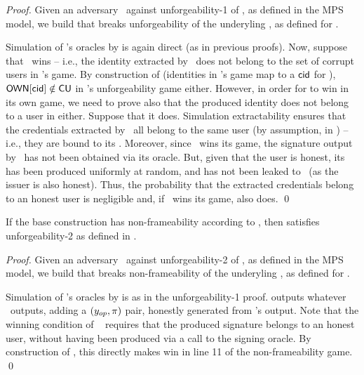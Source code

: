 \begin{proof}
  Given an adversary \adv~against unforgeability-1 of \CUASMPS, as defined in
  the MPS model, we build \advB that breaks unforgeability of the underyling
  \CUASGen, as defined for \UAS.

  Simulation of \adv's oracles by \advB is again direct (as in previous proofs).
  Now, suppose that \adv~wins -- i.e., the identity extracted by \adv~does not
  belong to the set of corrupt users in \adv's game. By construction of \advB
  (identities in \adv's game map to a $\mathsf{cid}$ for \advB), $\mathsf{OWN}[\mathsf{cid}] \notin
  \mathsf{CU}$ in \advB's unforgeability game either.
  However, in order for \advB to win in its own game, we need to prove also that
  the produced identity does not belong to a user in \HU either. Suppose that it
  does. Simulation extractability ensures that the credentials extracted by
  \adv~all belong to the same user (by assumption, in \HU) -- i.e., they are
  bound to its \usk. Moreover, since \adv~wins its game, the signature output by
  \adv~has not been obtained via its \SIGN oracle. But, given that the user is
  honest, its \usk has been produced uniformly at random, and has not been
  leaked to \adv~(as the issuer is also honest). Thus, the probability that
  the extracted credentials belong to an honest user is negligible and, if
  \adv~wins its game, \advB also does.
  \qed
\end{proof}

\begin{theorem}
  If the base \CUASGen construction has non-frameability according to
  , then \CUASMPS satisfies unforgeability-2 as
  defined in \cite{ngsy22}.
\end{theorem}

\begin{proof}
  Given an adversary \adv~against unforgeability-2 of \CUASMPS, as defined in
  the MPS model, we build \advB that breaks non-frameability of the underyling
  \CUASGen, as defined for \UAS.

  Simulation of \adv's oracles by \advB is as in the unforgeability-1 proof.
  \advB outputs whatever \adv~outputs, adding a $(y_{op},\pi)$ pair, honestly
  generated from \adv's output. Note that the winning condition of \adv~
  requires that the produced signature belongs to an honest user, without
  having been produced via a call to the signing oracle. By construction of
  \advB, this directly makes \advB win in line 11 of the non-frameability game.
  \qed
\end{proof}

